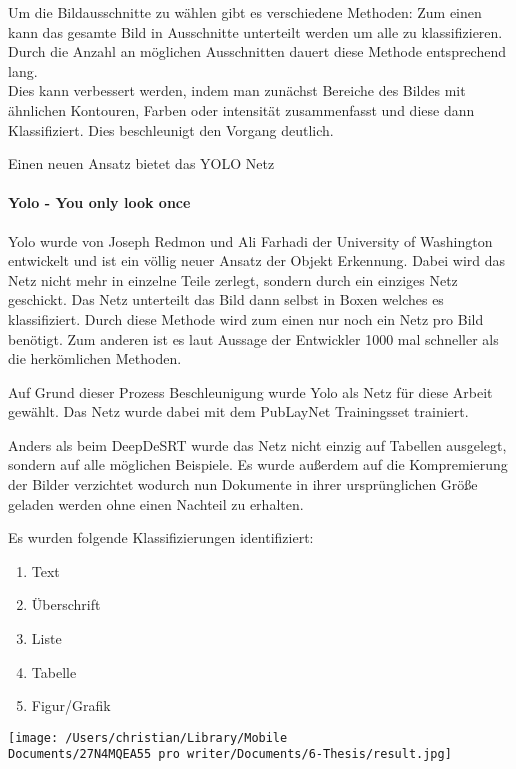 \documentclass[
]{article}
\begin{document}
Um die Bildausschnitte zu wählen gibt es verschiedene Methoden: Zum
einen kann das gesamte Bild in Ausschnitte unterteilt werden um alle zu
klassifizieren. Durch die Anzahl an möglichen Ausschnitten dauert diese
Methode entsprechend lang.\\
Dies kann verbessert werden, indem man zunächst Bereiche des Bildes mit
ähnlichen Kontouren, Farben oder intensität zusammenfasst und diese dann
Klassifiziert. Dies beschleunigt den Vorgang deutlich.

Einen neuen Ansatz bietet das YOLO Netz

\hypertarget{header-n127}{%
\paragraph{Yolo - You only look once}\label{header-n127}}

Yolo wurde von Joseph Redmon und Ali Farhadi der University of
Washington entwickelt und ist ein völlig neuer Ansatz der Objekt
Erkennung. Dabei wird das Netz nicht mehr in einzelne Teile zerlegt,
sondern durch ein einziges Netz geschickt. Das Netz unterteilt das Bild
dann selbst in Boxen welches es klassifiziert. Durch diese Methode wird
zum einen nur noch ein Netz pro Bild benötigt. Zum anderen ist es laut
Aussage der Entwickler 1000 mal schneller als die herkömlichen Methoden.

Auf Grund dieser Prozess Beschleunigung wurde Yolo als Netz für diese
Arbeit gewählt. Das Netz wurde dabei mit dem PubLayNet Trainingsset
trainiert.

Anders als beim DeepDeSRT wurde das Netz nicht einzig auf Tabellen
ausgelegt, sondern auf alle möglichen Beispiele. Es wurde außerdem auf
die Kompremierung der Bilder verzichtet wodurch nun Dokumente in ihrer
ursprünglichen Größe geladen werden ohne einen Nachteil zu erhalten.

Es wurden folgende Klassifizierungen identifiziert:

\begin{enumerate}
\def\labelenumi{\arabic{enumi}.}
\item
  Text
\item
  Überschrift
\item
  Liste
\item
  Tabelle
\item
  Figur/Grafik
\end{enumerate}

\texttt{[image: /Users/christian/Library/Mobile Documents/27N4MQEA55~pro~writer/Documents/6-Thesis/result.jpg]}
\end{document}
